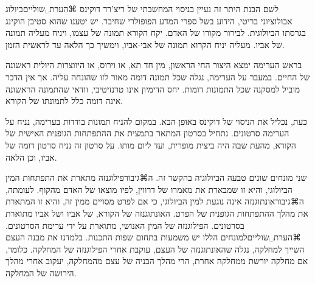 לשם הבנת היתר זה נעיין בניסוי המחשבתי של ריצ'רד דוקינס ⌘הערת␣שוליים{ביולוג אבולוציוני בריטי, הידוע בשל ספרי המדע הפופולרי שחיבר. יש יטענו שהוא סטיבן הוקינג בגרסתו הביולוגית.} לבירור מקורו של האדם. יקח הקורא תמונה של עצמו, ויניח מעליה תמונה של אביו. מעליה יניח הקרוא תמונה של אבי-אביו, וימשיך כך הלאה עד לראשית הזמן.

בראש הערימה ימצא היצור החי הראשון, מין חד תא, או וירוס, או היווצרות היולית ראשונה של החיים. במעבר על הערימה,  נגלה שכל תמונה דומה מאור לזו שהונחה עליה. אך אין הדבר מוביל למסקנה שכל התמונות דומות. יחס הדימיון אינו טרנזיטיבי, וודאי שהתמונה הראשונה אינה דומה כלל לתמונתו של הקורא. 

כעת, נכליל את הניסוי של דוקינס באופן הבא. במקום להניח תמונות בודדות בערימה, נניח על הערימה סרטונים. נתחיל בסרטון המתאר בתמצית את ההתפתחות הגופנית האישית של הקורא, מהעת שבה היה ביצית מופרית, ועד ליום מותו. על סרטון זה נניח סרטון דומה של אביו, וכן הלאה. 

שני מונחים שונים טבעה הביולוגיה בהקשר זה.  ה⌘גיבור{פילוגנזה} מתארת את התפתחות המין הביולוגי, והיא זו שמבארת את מאמרו של דרווין, לפיו מוצאו של האדם מהקוף. לעומתה, ה⌘גיבור{אונתוגנזה} אינה נוגעת למין הביולוגי, כי אם לפרט מסויים ממין זה, והיא זו המתארת את מהלך ההתפתחות הגופנית של הפרט. האונתוגנזה של הקורא, של אביו ושל אביו מתוארת בסרטונים. הפילוגנזה של המין האנושי, מתוארת על ידי ערימת הסרטונים. ⌘הערת␣שוליים{למונחים הללו יש משמעות בתחום שפות התכנות. בלמדנו את מבנה העצם השייך למחלקה, נגלה שהאונתוגנזה של העצם, עוקבת אחרי הפילוגנזה של המחלקה. כלומר, אם מחלקה יורשת ממחלקה אחרת, הרי מהלך הבניה של עצם מהמחלקה, יעקוב אחרי מהלך הירושה של המחלקה.}

